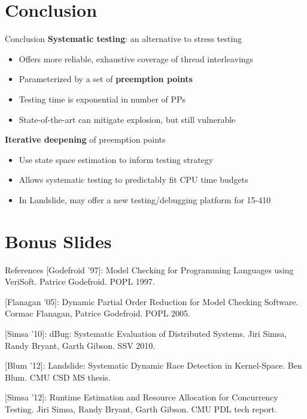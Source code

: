 \documentclass[xcolor=dvipsnames]{beamer}
\begin{document}
\section{Conclusion}


\begin{frame}{Conclusion}
	\textbf{Systematic testing}: an alternative to stress testing
	\begin{itemize}
		\item Offers more reliable, exhaustive coverage of thread interleavings
		\item Parameterized by a set of {\bf preemption points}
		\item Testing time is exponential in number of PPs %
		\item State-of-the-art can mitigate explosion, but still vulnerable
	\end{itemize}
	\linegap

	{\bf Iterative deepening} of preemption points
	\begin{itemize}
		\item Use state space estimation to inform testing strategy
		\item Allows systematic testing to predictably fit CPU time budgets
		\item In Landslide, may offer a new testing/debugging platform for 15-410
	\end{itemize}
\end{frame}



\section{Bonus Slides}

\begin{frame}{References}
	\small
	[Godefroid '97]:
	Model Checking for Programming Languages using VeriSoft.
	Patrice Godefroid.
	POPL 1997.
	\linegap

	[Flanagan '05]:
	Dynamic Partial Order Reduction for Model Checking Software.
	Cormac Flanagan, Patrice Godefroid.
	POPL 2005.
	\linegap

	[Simsa '10]:
	dBug: Systematic Evaluation of Distributed Systems.
	Jiri Simsa, Randy Bryant, Garth Gibson.
	SSV 2010.
	\linegap

	[Blum '12]:
	Landslide: Systematic Dynamic Race Detection in Kernel-Space.
	Ben Blum.
	CMU CSD MS thesis.
	\linegap

	[Simsa '12]:
	Runtime Estimation and Resource Allocation for Concurrency Testing.
	Jiri Simsa, Randy Bryant, Garth Gibson.
	CMU PDL tech report.
\end{frame}
\end{document}
